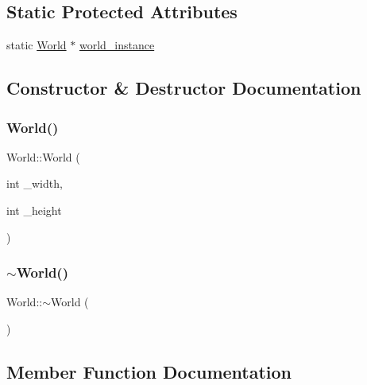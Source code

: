 \subsection*{Static Protected Attributes}
\begin{DoxyCompactItemize}
\item 
static \mbox{\hyperlink{classWorld}{World}} $\ast$ \mbox{\hyperlink{classWorld_aa19cb8336da15073b55b881ba2b33c64}{world\+\_\+instance}}
\end{DoxyCompactItemize}


\subsection{Constructor \& Destructor Documentation}
\mbox{\label{classWorld_aecef883ed3a1b5e0bb5ed487d7bf170c}} 
\subsubsection{\texorpdfstring{World()}{World()}}
{\footnotesize\ttfamily World\+::\+World (\begin{DoxyParamCaption}\item[{int}]{\+\_\+width,  }\item[{int}]{\+\_\+height }\end{DoxyParamCaption})\hspace{0.3cm}{\ttfamily [protected]}}

\mbox{\label{classWorld_a8c73fba541a5817fff65147ba47cd827}} 
\subsubsection{\texorpdfstring{$\sim$World()}{~World()}}
{\footnotesize\ttfamily World\+::$\sim$\+World (\begin{DoxyParamCaption}{ }\end{DoxyParamCaption})}



\subsection{Member Function Documentation}
\mbox{\label{classWorld_a0528144a2fb6016a20cdd19915c8b466}} 
